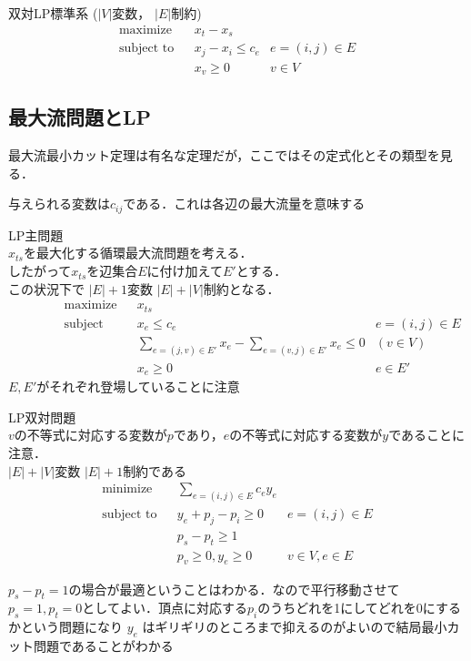 \documentclass[13pt, a4paper, landscape]{jarticle}
\theoremstyle{nonitalic} %
\begin{document}
双対LP標準系
($|V|$変数， $|E|$制約)
\begin{align}
 &&&&&\textrm{maximize}   && x_t - x_s \\
 &&&&&\textrm{subject to} && x_j - x_i\leq c_e & e = (i,j) \in E  &&&&&\\
 &&&&&                    && x_v \geq 0 & v \in V &&&&&
\end{align}

\subsection{最大流問題とLP}
最大流最小カット定理は有名な定理だが，ここではその定式化とその類型を見る．

与えられる変数は$c_{ij}$である．これは各辺の最大流量を意味する

LP主問題 \\
$x_{ts}$を最大化する循環最大流問題を考える． \\
したがって$x_{ts}$を辺集合$E$に付け加えて$E'$とする．\\
この状況下で $|E|+1$変数 $|E|+|V|$制約となる．
\begin{align}
 &&&&&\textrm{maximize}   && x_{ts}  \\
 &&&&&\textrm{subject to} && x_e\leq c_e & e = (i,j) \in E  &&&&&\\
 &&&&&                    && \sum_{e = (j,v) \in E'} x_e - \sum_{e=(v,j) \in E'} x_e \leq 0 & (v \in V) &&&&& \\
 &&&&&                    && x_e \geq 0 & e \in E' &&&&&
\end{align}
$E, E'$がそれぞれ登場していることに注意


LP双対問題 \\
$v$の不等式に対応する変数が$p$であり，$e$の不等式に対応する変数が$y$であることに注意．\\
$|E|+|V|$変数 $|E|+1$制約である
\begin{align}
 &&&&&\textrm{minimize}   && \sum_{e=(i,j)\in E} c_e y_e  \\
 &&&&&\textrm{subject to} && y_e + p_j - p_i \geq 0 &  e = (i, j) \in E  &&&&&\\
 &&&&&                    && p_s - p_t  \geq 1         &&&&& \\
 &&&&&                    && p_v \geq 0,  y_e \geq 0 &  v \in V, e \in E &&&&&
\end{align}

$p_s-p_t=1$の場合が最適ということはわかる．なので平行移動させて$p_s=1, p_t=0$としてよい．頂点に対応する$p_i$のうちどれを1にしてどれを0にするかという問題になり $y_e$ はギリギリのところまで抑えるのがよいので結局最小カット問題であることがわかる
\end{document}
